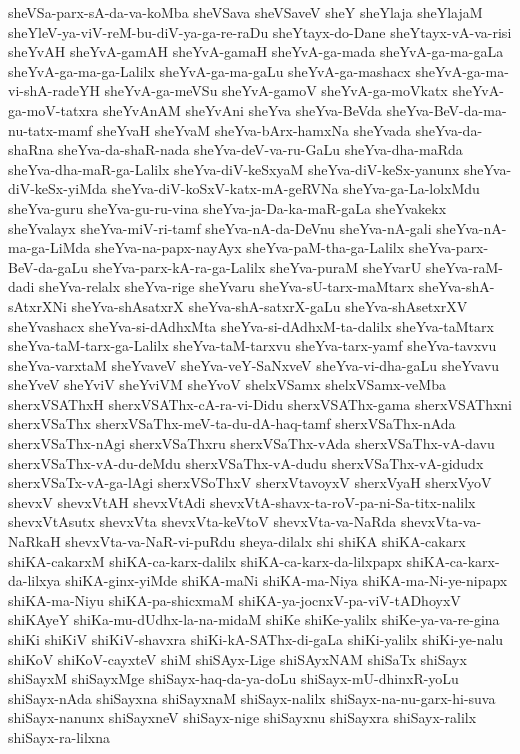{sheVSa-parx-sA-da-va-koMba
sheVSava
sheVSaveV
sheY
sheYlaja
sheYlajaM
sheYleV-ya-viV-reM-bu-diV-ya-ga-re-raDu
sheYtayx-do-Dane
sheYtayx-vA-va-risi
sheYvAH
sheYvA-gamAH
sheYvA-gamaH
sheYvA-ga-mada
sheYvA-ga-ma-gaLa
sheYvA-ga-ma-ga-Lalilx
sheYvA-ga-ma-gaLu
sheYvA-ga-mashacx
sheYvA-ga-ma-vi-shA-radeYH
sheYvA-ga-meVSu
sheYvA-gamoV
sheYvA-ga-moVkatx
sheYvA-ga-moV-tatxra
sheYvAnAM
sheYvAni
sheYva
sheYva-BeVda
sheYva-BeV-da-ma-nu-tatx-mamf
sheYvaH
sheYvaM
sheYva-bArx-hamxNa
sheYvada
sheYva-da-shaRna
sheYva-da-shaR-nada
sheYva-deV-va-ru-GaLu
sheYva-dha-maRda
sheYva-dha-maR-ga-Lalilx
sheYva-diV-keSxyaM
sheYva-diV-keSx-yanunx
sheYva-diV-keSx-yiMda
sheYva-diV-koSxV-katx-mA-geRVNa
sheYva-ga-La-lolxMdu
sheYva-guru
sheYva-gu-ru-vina
sheYva-ja-Da-ka-maR-gaLa
sheYvakekx
sheYvalayx
sheYva-miV-ri-tamf
sheYva-nA-da-DeVnu
sheYva-nA-gali
sheYva-nA-ma-ga-LiMda
sheYva-na-papx-nayAyx
sheYva-paM-tha-ga-Lalilx
sheYva-parx-BeV-da-gaLu
sheYva-parx-kA-ra-ga-Lalilx
sheYva-puraM
sheYvarU
sheYva-raM-dadi
sheYva-relalx
sheYva-rige
sheYvaru
sheYva-sU-tarx-maMtarx
sheYva-shA-sAtxrXNi
sheYva-shAsatxrX
sheYva-shA-satxrX-gaLu
sheYva-shAsetxrXV
sheYvashacx
sheYva-si-dAdhxMta
sheYva-si-dAdhxM-ta-dalilx
sheYva-taMtarx
sheYva-taM-tarx-ga-Lalilx
sheYva-taM-tarxvu
sheYva-tarx-yamf
sheYva-tavxvu
sheYva-varxtaM
sheYvaveV
sheYva-veY-SaNxveV
sheYva-vi-dha-gaLu
sheYvavu
sheYveV
sheYviV
sheYviVM
sheYvoV
shelxVSamx
shelxVSamx-veMba
sherxVSAThxH
sherxVSAThx-cA-ra-vi-Didu
sherxVSAThx-gama
sherxVSAThxni
sherxVSaThx
sherxVSaThx-meV-ta-du-dA-haq-tamf
sherxVSaThx-nAda
sherxVSaThx-nAgi
sherxVSaThxru
sherxVSaThx-vAda
sherxVSaThx-vA-davu
sherxVSaThx-vA-du-deMdu
sherxVSaThx-vA-dudu
sherxVSaThx-vA-gidudx
sherxVSaTx-vA-ga-lAgi
sherxVSoThxV
sherxVtavoyxV
sherxVyaH
sherxVyoV
shevxV
shevxVtAH
shevxVtAdi
shevxVtA-shavx-ta-roV-pa-ni-Sa-titx-nalilx
shevxVtAsutx
shevxVta
shevxVta-keVtoV
shevxVta-va-NaRda
shevxVta-va-NaRkaH
shevxVta-va-NaR-vi-puRdu
sheya-dilalx
shi
shiKA
shiKA-cakarx
shiKA-cakarxM
shiKA-ca-karx-dalilx
shiKA-ca-karx-da-lilxpapx
shiKA-ca-karx-da-lilxya
shiKA-ginx-yiMde
shiKA-maNi
shiKA-ma-Niya
shiKA-ma-Ni-ye-nipapx
shiKA-ma-Niyu
shiKA-pa-shicxmaM
shiKA-ya-jocnxV-pa-viV-tADhoyxV
shiKAyeY
shiKa-mu-dUdhx-la-na-midaM
shiKe
shiKe-yalilx
shiKe-ya-va-re-gina
shiKi
shiKiV
shiKiV-shavxra
shiKi-kA-SAThx-di-gaLa
shiKi-yalilx
shiKi-ye-nalu
shiKoV
shiKoV-cayxteV
shiM
shiSAyx-Lige
shiSAyxNAM
shiSaTx
shiSayx
shiSayxM
shiSayxMge
shiSayx-haq-da-ya-doLu
shiSayx-mU-dhinxR-yoLu
shiSayx-nAda
shiSayxna
shiSayxnaM
shiSayx-nalilx
shiSayx-na-nu-garx-hi-suva
shiSayx-nanunx
shiSayxneV
shiSayx-nige
shiSayxnu
shiSayxra
shiSayx-ralilx
shiSayx-ra-lilxna
}
